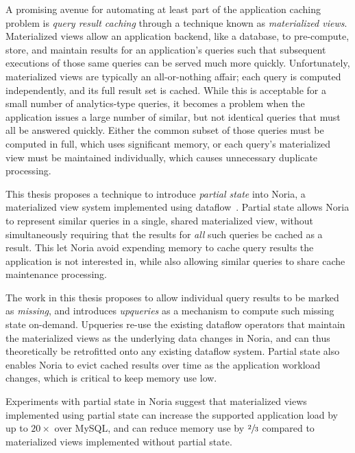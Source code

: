 A promising avenue for automating at least part of the application caching
problem is \emph{query result caching} through a technique known as
\emph{materialized views}. Materialized views allow an application backend, like
a database, to pre-compute, store, and maintain results for an application's
queries such that subsequent executions of those same queries can be served much
more quickly. Unfortunately, materialized views are typically an all-or-nothing
affair; each query is computed independently, and its full result set is cached.
While this is acceptable for a small number of analytics-type queries, it
becomes a problem when the application issues a large number of similar, but not
identical queries that must all be answered quickly. Either the common subset of
those queries must be computed in full, which uses significant memory, or each
query's materialized view must be maintained individually, which causes
unnecessary duplicate processing.

This thesis proposes a technique to introduce \textit{partial state} into Noria,
a materialized view system implemented using dataflow~\cite{noria}. Partial
state allows Noria to represent similar queries in a single, shared materialized
view, without simultaneously requiring that the results for \emph{all} such
queries be cached as a result. This let Noria avoid expending memory to cache
query results the application is not interested in, while also allowing similar
queries to share cache maintenance processing.

The work in this thesis proposes to allow individual query results to be marked
as \textit{missing}, and introduces \textit{upqueries} as a mechanism to compute
such missing state on-demand. Upqueries re-use the existing dataflow operators
that maintain the materialized views as the underlying data changes in Noria,
and can thus theoretically be retrofitted onto any existing dataflow system.
Partial state also enables Noria to evict cached results over time as the
application workload changes, which is critical to keep memory use low.

Experiments with partial state in Noria suggest that materialized views
implemented using partial state can increase the supported application load by
up to $20\times$ over MySQL, and can reduce memory use by $\sfrac{2}{3}$
compared to materialized views implemented without partial state.


